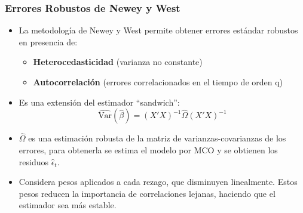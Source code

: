 \documentclass{beamer}
\begin{document}
\begin{frame}
\frametitle{Errores Robustos de \textbf{Newey} y \textbf{West}}

\begin{itemize}
    \item La metodología de Newey y West permite obtener errores estándar robustos en presencia de:
    \begin{itemize}
        \item \textbf{Heterocedasticidad} (varianza no constante)
        \item \textbf{Autocorrelación} (errores correlacionados en el tiempo de orden q)
    \end{itemize}

    \item Es una extensión del estimador “sandwich”:
    \[
    \widehat{\text{Var}}(\hat{\beta}) = (X'X)^{-1} \hat{\Omega} (X'X)^{-1}
    \]
          \item  \( \hat{\Omega} \) es una estimación robusta de la matriz de varianzas-covarianzas de los errores, para obtenerla se estima el modelo por MCO y se obtienen los residuos \( \hat{\epsilon}_t\).
 

\item Considera pesos aplicados a cada rezago, que disminuyen linealmente. Estos pesos reducen la importancia de correlaciones lejanas, haciendo que el estimador sea más estable.
   
\end{itemize}
\end{frame}
\end{document}
